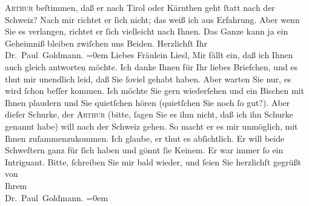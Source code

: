 \begin{ledgroupsized}[t]{13cm}
                  \textsc{Arthur} beſtimmen, daß er nach Tirol oder Kärnthen geht
               ſtatt nach der Schweiz? Nach mir richtet er
               ſich nicht; das weiß ich aus Erfahrung. Aber wenn Sie es verlangen, richtet er ſich
               vielleicht nach Ihnen. Das Ganze kann ja ein Geheimniß bleiben zwiſchen uns  Beiden.\pend
           \pstart
           Herzlichſt Ihr {\\[\baselineskip]}\spacefill\mbox{Dr. Paul Goldmann.}\pend
           \leftskip=0em{}{\bigskip}\pstart
           \noindent{}{\pb}Liebes Fräulein Liesl,\pend
           \pstart
           Mir fällt ein, daß ich Ihnen auch gleich antworten möchte. Ich danke Ihnen für Ihr
               liebes Briefchen, und es thut mir unendlich leid, daß Sie ſoviel \label{K_L03071-3v}\label{K_L03071-3h} gehabt
               haben. Aber warten Sie nur, es wird ſchon beſſer kommen. Ich möchte Sie gern
               wiederſehen und ein Bischen mit Ihnen plaudern und Sie quietſchen hören (quietſchen
               Sie noch ſo gut?). Aber dieſer {\pb}Schurke, der \textsc{Arthur} (bitte,  ſagen Sie es ihm \strikeout{\textcolor{gray}{×}\-\textcolor{gray}{×}\-\textcolor{gray}{×}} nicht, daß ich ihn Schurke genannt habe) will nach der Schweiz gehen. So macht er es mir unmöglich, mit Ihnen
               zuſammenzukommen. Ich glaube, er thut es abſichtlich. Er will beide Schweſtern ganz
               für ſich haben und gönnt ſie Keinem. Er war immer ſo ein Intriguant.\pend
           \pstart
           {\pb}Bitte, ſchreiben Sie mir bald wieder, und ſeien Sie
               herzlichſt gegrüßt von {\\[\baselineskip]}Ihrem {\\[\baselineskip]}\spacefill\mbox{Dr. Paul Goldmann.}\pend
           \leftskip=0em{}
         
         \endnumbering{}\end{ledgroupsized}  \newcommand{\dateiname}{L03071}\newcommand{\titel}{Paul Goldmann an Arthur Schnitzler, Olga und Elisabeth Gussmann, 3. 7. [1901]}\newcommand{\editorInnen}{Martin Anton Müller und Laura Untner}
      